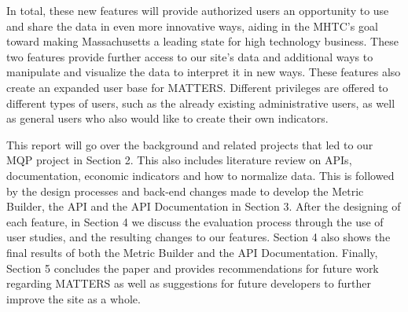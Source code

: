 	In total, these new 
	features will provide authorized users an opportunity to use and share the 
	data in even more innovative ways, aiding in the MHTC's goal toward making 
	Massachusetts a leading state for high technology business. These two features 
	provide further access to our site's data and additional ways to manipulate and 
	visualize the data to interpret it in new ways. These features also create an 
	expanded user base for MATTERS. Different privileges are offered to different types of 
	users, such as the already existing administrative users, as well as general users who 
	also would like to create their own indicators.
	
	This report will go over the background and related projects that led to our MQP project in Section 2. This also includes literature review on APIs, documentation, economic indicators and how to normalize data. This is followed by the design processes and back-end changes made to develop the Metric Builder, the API and the API Documentation in Section 3. After the designing of each feature, in Section 4 we discuss the evaluation process through the use of user studies, and the resulting changes to our features. Section 4 also shows the final results of both the Metric Builder and the API Documentation. Finally, Section 5 concludes the paper and provides recommendations for future work regarding MATTERS as well as suggestions for future developers to further improve the site as a whole.